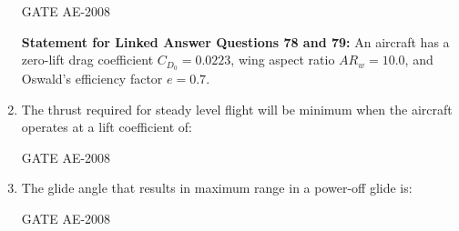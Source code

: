 \documentclass[journal,12pt,onecolumn]{IEEEtran}
\theoremstyle{remark}
\begin{document}
\begin{enumerate}
\begin{enumerate}
\end{enumerate}
\hfill{GATE AE-2008}

\quad 

\textbf{Statement for Linked Answer Questions 78 and 79:}  
An aircraft has a zero-lift drag coefficient $C_{D_0} = 0.0223$, wing aspect ratio $AR_w = 10.0$, and Oswald's efficiency factor $e = 0.7$.\\

\item The thrust required for steady level flight will be minimum when the aircraft operates at a lift coefficient of:  \\

\begin{enumerate}
\end{enumerate}
\hfill{GATE AE-2008}

\quad 

\item The glide angle that results in maximum range in a power-off glide is:  \\

\begin{enumerate}
\end{enumerate}
\hfill{GATE AE-2008}


\end{enumerate}
\end{document}
